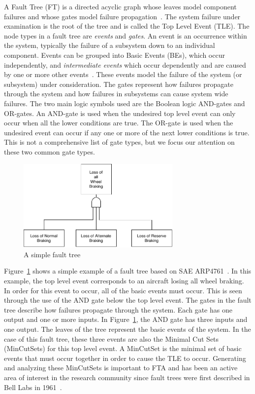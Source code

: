 A Fault Tree (FT) is a directed acyclic graph whose leaves model component failures and whose gates model failure propagation~\cite{0f356f05e72f43018211b36f97c8854a}. The system failure under examination is the root of the tree and is called the Top Level Event (TLE). The node types in a fault tree are \textit{events} and \textit{gates}. An event is an occurrence within the system, typically the failure of a subsystem down to an individual component. Events can be grouped into Basic Events (BEs), which occur independently, and \textit{intermediate events} which occur dependently and are caused by one or more other events~\cite{historyFTA}.  These events model the failure of the system (or subsystem) under consideration. The gates represent how failures propagate through the system and how failures in subsystems can cause system wide failures. The two main logic symbols used are the Boolean logic AND-gates and OR-gates. An AND-gate is used when the undesired top level event can only occur when all the lower conditions are true. The OR-gate is used when the undesired event can occur if any one or more of the next lower conditions is true. This is not a comprehensive list of gate types, but we focus our attention on these two common gate types. 
\begin{figure}[h]
\begin{center}
\includegraphics[width=8cm]{images/introFT2.pdf}
\caption{A simple fault tree} \label{fig:introFT}
\end{center}
\end{figure}

Figure~\ref{fig:introFT} shows a simple example of a fault tree based on SAE ARP4761~\cite{SAE:ARP4761}. In this example, the top level event corresponds to an aircraft losing all wheel braking. In order for this event to occur, all of the basic events must occur. This is seen through the use of the AND gate below the top level event. The gates in the fault tree describe how failures propagate through the system. Each gate has one output and one or more inputs. In Figure~\ref{fig:introFT}, the AND gate has three inputs and one output. The leaves of the tree represent the basic events of the system. %
In the case of this fault tree, these three events are also the Minimal Cut Sets (MinCutSets) for this top level event. A MinCutSet is the minimal set of basic events that must occur together in order to cause the TLE to occur. Generating and analyzing these MinCutSets is important to FTA and has been an active area of interest in the research community since fault trees were first described in Bell Labs in 1961~\cite{historyFTA,0f356f05e72f43018211b36f97c8854a}. 

